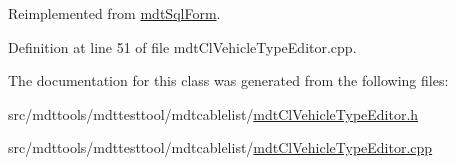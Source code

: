 Reimplemented from \hyperlink{classmdt_sql_form_a27fe6e45aa5d4d7782aad9833e6de20b}{mdt\-Sql\-Form}.



Definition at line 51 of file mdt\-Cl\-Vehicle\-Type\-Editor.\-cpp.



The documentation for this class was generated from the following files\-:\begin{DoxyCompactItemize}
\item 
src/mdttools/mdttesttool/mdtcablelist/\hyperlink{mdt_cl_vehicle_type_editor_8h}{mdt\-Cl\-Vehicle\-Type\-Editor.\-h}\item 
src/mdttools/mdttesttool/mdtcablelist/\hyperlink{mdt_cl_vehicle_type_editor_8cpp}{mdt\-Cl\-Vehicle\-Type\-Editor.\-cpp}\end{DoxyCompactItemize}
